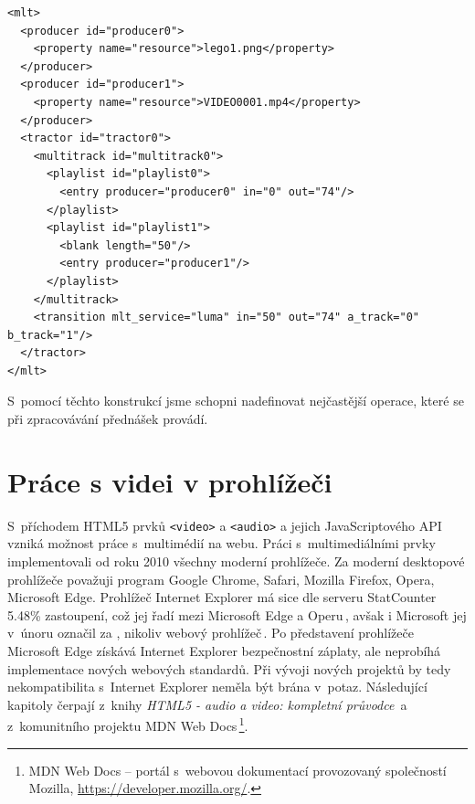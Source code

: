 \begin{lstlisting}[style=xml]
<mlt>
  <producer id="producer0">
    <property name="resource">lego1.png</property>
  </producer>
  <producer id="producer1">
    <property name="resource">VIDEO0001.mp4</property>
  </producer>
  <tractor id="tractor0">
    <multitrack id="multitrack0">
      <playlist id="playlist0">
        <entry producer="producer0" in="0" out="74"/>
      </playlist>
      <playlist id="playlist1">
        <blank length="50"/>
        <entry producer="producer1"/>
      </playlist>
    </multitrack>
    <transition mlt_service="luma" in="50" out="74" a_track="0" b_track="1"/>
  </tractor>
</mlt>
\end{lstlisting}

S~pomocí těchto konstrukcí jsme schopni nadefinovat nejčastější operace, které se při zpracovávání přednášek provádí.

\section{Práce s videi v prohlížeči}
S~příchodem HTML5 prvků \texttt{<video>} a \texttt{<audio>} a jejich JavaScriptového API vzniká možnost práce s~multimédií na webu. Práci s~multimediálními prvky implementovali od roku 2010 všechny moderní prohlížeče. Za moderní desktopové prohlížeče považuji program Google Chrome, Safari, Mozilla Firefox, Opera, Microsoft Edge. Prohlížeč Internet Explorer má sice dle serveru StatCounter 5.48\% zastoupení, což jej řadí mezi Microsoft Edge a Operu\,\cite{statcounter}, avšak i Microsoft jej v~únoru označil za , nikoliv webový prohlížeč\,\cite{internetExplorer}. Po představení prohlížeče Microsoft Edge získává Internet Explorer bezpečnostní záplaty, ale neprobíhá implementace nových webových standardů. Při vývoji nových projektů by tedy nekompatibilita s~Internet Explorer neměla být brána v~potaz. Následující kapitoly čerpají z~knihy \textit{HTML5 - audio a video: kompletní průvodce}\,\cite{HTML5multimedia} a z~komunitního projektu MDN Web Docs\,\footnote{MDN Web Docs -- portál s~webovou dokumentací provozovaný společností Mozilla, \url{https://developer.mozilla.org/}.}.

